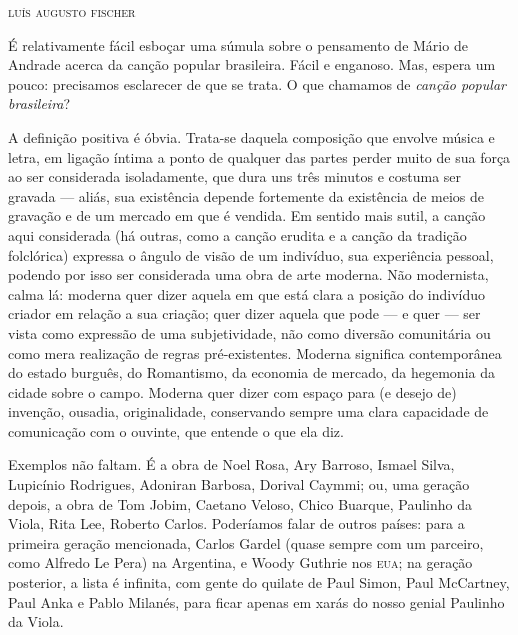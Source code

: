 
\begin{flushright}
\textsc{luís augusto fischer}
\end{flushright}

\noindent{}É relativamente fácil esboçar uma súmula sobre o pensamento de Mário de
Andrade acerca da canção popular brasileira. Fácil e enganoso. Mas, espera um pouco: precisamos esclarecer de que se trata. O que chamamos de \textit{canção popular brasileira}?

A definição positiva é óbvia. Trata-se daquela composição que envolve
música e letra, em ligação íntima a ponto de qualquer das partes perder
muito de sua força ao ser considerada isoladamente, que dura uns três
minutos e costuma ser gravada --- aliás, sua existência depende
fortemente da existência de meios de gravação e de um mercado em que é
vendida. Em sentido mais sutil, a canção aqui considerada (há outras,
como a canção erudita e a canção da tradição folclórica) expressa o
ângulo de visão de um indivíduo, sua experiência pessoal, podendo por
isso ser considerada uma obra de arte moderna. Não modernista, calma
lá: moderna quer dizer aquela em que está clara a posição do indivíduo
criador em relação a sua criação; quer dizer aquela que pode --- e quer ---
ser vista como expressão de uma subjetividade, não como diversão
comunitária ou como mera realização de regras pré-existentes. Moderna
significa contemporânea do estado burguês, do Romantismo, da economia de
mercado, da hegemonia da cidade sobre o campo. Moderna quer dizer com
espaço para (e desejo de) invenção, ousadia, originalidade, conservando
sempre uma clara capacidade de comunicação com o ouvinte, que entende o
que ela diz.

Exemplos não faltam. É a obra de Noel Rosa, Ary Barroso, Ismael Silva,
Lupicínio Rodrigues, Adoniran Barbosa, Dorival Caymmi; ou, uma geração
depois, a obra de Tom Jobim, Caetano Veloso, Chico Buarque, Paulinho da
Viola, Rita Lee, Roberto Carlos. Poderíamos falar de outros países: para
a primeira geração mencionada, Carlos Gardel (quase sempre com um
parceiro, como Alfredo Le Pera) na Argentina, e Woody Guthrie nos \textsc{eua};
na geração posterior, a lista é infinita, com gente do quilate de Paul
Simon, Paul McCartney, Paul Anka e Pablo Milanés, para ficar apenas em
xarás do nosso genial Paulinho da Viola. 

